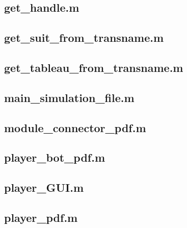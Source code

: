 \documentclass[runningheads,a4paper]{llncs}
\newcommand{\GPenSIM}{../GPenSIM}
\begin{document}
\subsection{get\_handle.m}
\label{app:get_handle}


\subsection{get\_suit\_from\_transname.m}
\label{app:get_suit_from_transname}


\subsection{get\_tableau\_from\_transname.m}
\label{app:get_tableau_from_transname}


\subsection{main\_simulation\_file.m}
\label{app:main_simulation_file}


\subsection{module\_connector\_pdf.m}
\label{app:module_connector_pdf}


\subsection{player\_bot\_pdf.m}
\label{app:player_bot_pdf}


\subsection{player\_GUI.m}
\label{app:player_GUI}


\subsection{player\_pdf.m}
\label{app:player_pdf}

\end{document}

